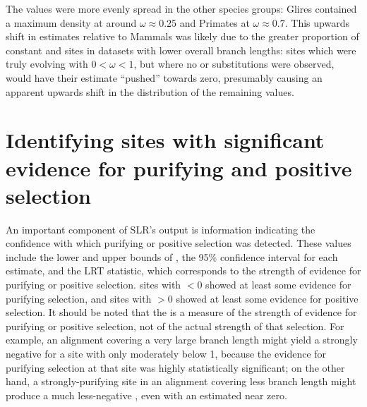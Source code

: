 The \nz \omgml values were more evenly spread in the other species
groups: Glires contained a maximum \nz \omgml density at around
$\omega\approx0.25$ and Primates at $\omega\approx0.7$. This upwards
shift in \nz \omgml estimates relative to Mammals was likely due to
the greater proportion of constant and \syn sites in datasets with
lower overall branch lengths: sites which were truly evolving with
$0<\omega<1$, but where no \nsyn or \syn substitutions were observed,
would have their \omgml estimate ``pushed'' towards zero, presumably
causing an apparent upwards shift in the distribution of the remaining
\nz \omgml values.

\section{Identifying sites with significant evidence for purifying and positive selection}
\label{section_pos_pur}

An important component of SLR's output is \sw information indicating
the confidence with which purifying or positive selection was
detected. These values include the lower and upper bounds of \ci, the
95\% confidence interval for each \omgml estimate, and the LRT
statistic, which corresponds to the strength of evidence for purifying
or positive selection.  sites with \slrt$<0$ showed at least some
evidence for purifying selection, and sites with \slrt$>0$ showed at
least some evidence for positive selection. It should be noted that
the \slrt is a measure of the strength of evidence for purifying or
positive selection, not of the actual strength of that selection. For
example, an alignment covering a very large branch length might yield
a strongly negative \slrt for a site with \omgml only moderately below
1, because the evidence for purifying selection at that site was
highly statistically significant; on the other hand, a
strongly-purifying site in an alignment covering less branch length
might produce a much less-negative \slrt, even with an estimated
\omgml near zero.

